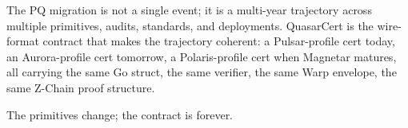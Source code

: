 The PQ migration is not a single event; it is a multi-year
trajectory across multiple primitives, audits, standards, and
deployments. QuasarCert is the wire-format contract that makes the
trajectory coherent: a Pulsar-profile cert today, an Aurora-profile
cert tomorrow, a Polaris-profile cert when Magnetar matures, all
carrying the same Go struct, the same verifier, the same Warp
envelope, the same Z-Chain proof structure.

The primitives change; the contract is forever.
